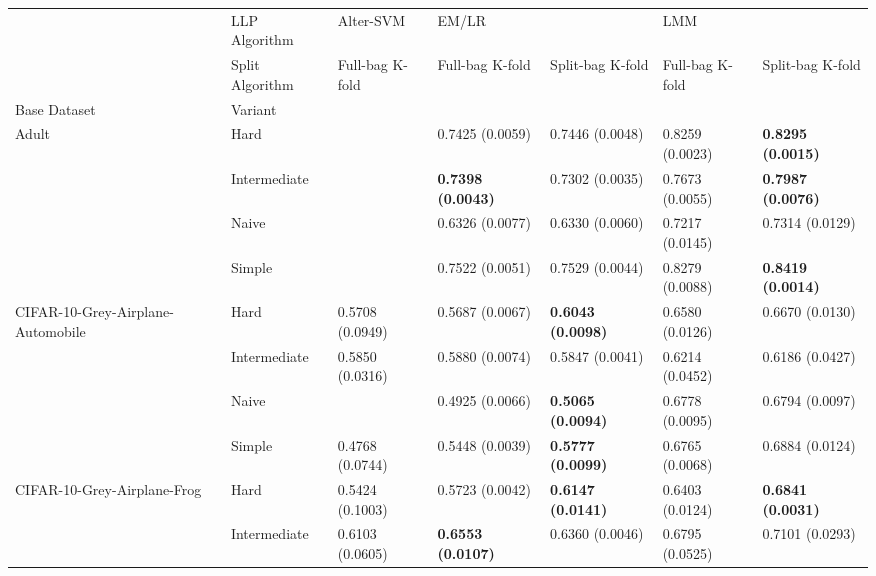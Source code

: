 \begin{tabular}{lllllll}
\toprule
                 & LLP Algorithm &        Alter-SVM & \multicolumn{2}{l}{EM/LR} & \multicolumn{2}{l}{LMM} \\
                 & Split Algorithm &  Full-bag K-fold &           Full-bag K-fold &          Split-bag K-fold &           Full-bag K-fold &          Split-bag K-fold \\
Base Dataset & Variant &                  &                           &                           &                           &                           \\
\midrule
Adult & Hard &                  &           0.7425 (0.0059) &           0.7446 (0.0048) &           0.8259 (0.0023) &  \textbf{0.8295 (0.0015)} \\
                 & Intermediate &                  &  \textbf{0.7398 (0.0043)} &           0.7302 (0.0035) &           0.7673 (0.0055) &  \textbf{0.7987 (0.0076)} \\
                 & Naive &                  &           0.6326 (0.0077) &           0.6330 (0.0060) &           0.7217 (0.0145) &           0.7314 (0.0129) \\
                 & Simple &                  &           0.7522 (0.0051) &           0.7529 (0.0044) &           0.8279 (0.0088) &  \textbf{0.8419 (0.0014)} \\
CIFAR-10-Grey-Airplane-Automobile & Hard &  0.5708 (0.0949) &           0.5687 (0.0067) &  \textbf{0.6043 (0.0098)} &           0.6580 (0.0126) &           0.6670 (0.0130) \\
                 & Intermediate &  0.5850 (0.0316) &           0.5880 (0.0074) &           0.5847 (0.0041) &           0.6214 (0.0452) &           0.6186 (0.0427) \\
                 & Naive &                  &           0.4925 (0.0066) &  \textbf{0.5065 (0.0094)} &           0.6778 (0.0095) &           0.6794 (0.0097) \\
                 & Simple &  0.4768 (0.0744) &           0.5448 (0.0039) &  \textbf{0.5777 (0.0099)} &           0.6765 (0.0068) &           0.6884 (0.0124) \\
CIFAR-10-Grey-Airplane-Frog & Hard &  0.5424 (0.1003) &           0.5723 (0.0042) &  \textbf{0.6147 (0.0141)} &           0.6403 (0.0124) &  \textbf{0.6841 (0.0031)} \\
                 & Intermediate &  0.6103 (0.0605) &  \textbf{0.6553 (0.0107)} &           0.6360 (0.0046) &           0.6795 (0.0525) &           0.7101 (0.0293) \\

\end{tabular}
